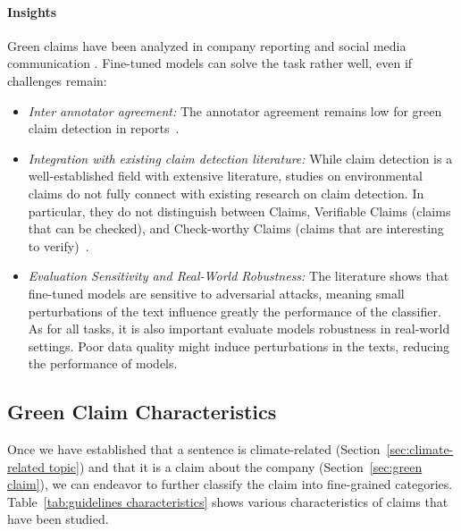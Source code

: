 \paragraph{Insights}  
Green claims have been analyzed in company reporting \citep{stammbach_environmental_2023} and social media communication \citep{vinicius_woloszyn_towards_2021}. Fine-tuned models can solve the task rather well, even if challenges remain:
\begin{itemize}
\item \textit{Inter annotator agreement:} The annotator agreement remains low for green claim detection in reports~\cite{stammbach_environmental_2023}.
    \item \textit{Integration with existing claim detection literature:} While claim detection is a well-established field with extensive literature, studies on environmental claims do not fully connect with existing research on claim detection. In particular, they do not distinguish between Claims, Verifiable Claims (claims that can be checked), and Check-worthy Claims (claims that are interesting to verify)~\cite{panchendrarajan2024claim}.
    \item \textit{Evaluation Sensitivity and Real-World Robustness:} The literature shows that fine-tuned models are sensitive to adversarial attacks, meaning small perturbations of the text influence greatly the performance of the classifier. As for all tasks, it is also important evaluate models robustness in real-world settings. Poor data quality might induce perturbations in the texts, reducing the performance of models.
\end{itemize}

\subsection{Green Claim Characteristics}
\label{sec: claim characteristics}

Once we have established that a sentence is climate-related (Section~\ref{sec:climate-related topic}) and that it is a claim about the company (Section~\ref{sec:green claim}), we can endeavor to further classify the claim into fine-grained categories. Table~\ref{tab:guidelines characteristics} shows various characteristics of claims that have been studied.

